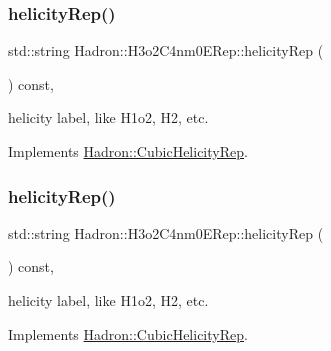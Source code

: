 \mbox{\label{structHadron_1_1H3o2C4nm0ERep_a9e53bc16d985036a9009fab7db6347a1}} 
\subsubsection{\texorpdfstring{helicityRep()}{helicityRep()}\hspace{0.1cm}{\footnotesize\ttfamily [1/3]}}
{\footnotesize\ttfamily std\+::string Hadron\+::\+H3o2\+C4nm0\+E\+Rep\+::helicity\+Rep (\begin{DoxyParamCaption}{ }\end{DoxyParamCaption}) const\hspace{0.3cm}{\ttfamily [inline]}, {\ttfamily [virtual]}}

helicity label, like H1o2, H2, etc. 

Implements \mbox{\hyperlink{structHadron_1_1CubicHelicityRep_af1096946b7470edf0a55451cc662f231}{Hadron\+::\+Cubic\+Helicity\+Rep}}.

\mbox{\label{structHadron_1_1H3o2C4nm0ERep_a9e53bc16d985036a9009fab7db6347a1}} 
\subsubsection{\texorpdfstring{helicityRep()}{helicityRep()}\hspace{0.1cm}{\footnotesize\ttfamily [2/3]}}
{\footnotesize\ttfamily std\+::string Hadron\+::\+H3o2\+C4nm0\+E\+Rep\+::helicity\+Rep (\begin{DoxyParamCaption}{ }\end{DoxyParamCaption}) const\hspace{0.3cm}{\ttfamily [inline]}, {\ttfamily [virtual]}}

helicity label, like H1o2, H2, etc. 

Implements \mbox{\hyperlink{structHadron_1_1CubicHelicityRep_af1096946b7470edf0a55451cc662f231}{Hadron\+::\+Cubic\+Helicity\+Rep}}.

\mbox{\label{structHadron_1_1H3o2C4nm0ERep_a9e53bc16d985036a9009fab7db6347a1}} 
